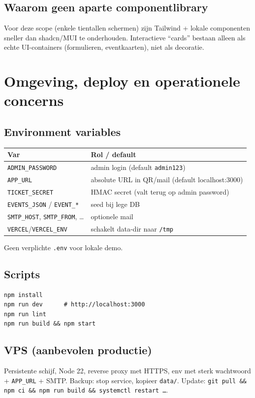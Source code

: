 \documentclass[11pt,a4paper]{report}
\begin{document}
\section{Waarom geen aparte componentlibrary}
Voor deze scope (enkele tientallen schermen) zijn Tailwind + lokale componenten sneller
dan shadcn/MUI te onderhouden. Interactieve ``cards'' bestaan alleen als echte UI-containers
(formulieren, eventkaarten), niet als decoratie.

\chapter{Omgeving, deploy en operationele concerns}

\section{Environment variables}
\begin{tabularx}{\textwidth}{@{}lX@{}}
\toprule
\textbf{Var} & \textbf{Rol / default} \\
\midrule
\texttt{ADMIN\_PASSWORD} & admin login (default \texttt{admin123}) \\
\texttt{APP\_URL} & absolute URL in QR/mail (default localhost:3000) \\
\texttt{TICKET\_SECRET} & HMAC secret (valt terug op admin password) \\
\texttt{EVENTS\_JSON} / \texttt{EVENT\_*} & seed bij lege DB \\
\texttt{SMTP\_HOST}, \texttt{SMTP\_FROM}, \ldots & optionele mail \\
\texttt{VERCEL}/\texttt{VERCEL\_ENV} & schakelt data-dir naar \texttt{/tmp} \\
\bottomrule
\end{tabularx}
Geen verplichte \texttt{.env} voor lokale demo.

\section{Scripts}
\begin{lstlisting}
npm install
npm run dev      # http://localhost:3000
npm run lint
npm run build && npm start
\end{lstlisting}

\section{VPS (aanbevolen productie)}
Persistente schijf, Node 22, reverse proxy met HTTPS, env met sterk wachtwoord +
\texttt{APP\_URL} + SMTP. Backup: stop service, kopieer \texttt{data/}.
Update: \texttt{git pull \&\& npm ci \&\& npm run build \&\& systemctl restart \ldots}.
\end{document}
